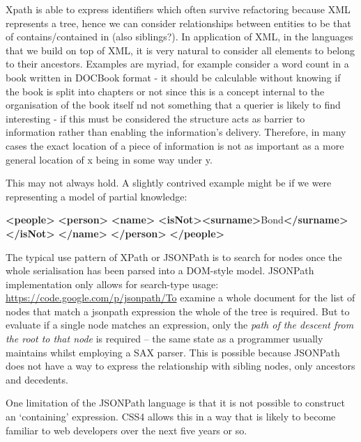 \documentclass[]{article}
\newenvironment{Shaded}{}{}
\newcommand{\KeywordTok}[1]{\textcolor[rgb]{0.00,0.44,0.13}{\textbf{{#1}}}}
\newcommand{\NormalTok}[1]{{#1}}
\begin{document}
Xpath is able to express identifiers which often survive refactoring
because XML represents a tree, hence we can consider relationships
between entities to be that of contains/contained in (also siblings?).
In application of XML, in the languages that we build on top of XML, it
is very natural to consider all elements to belong to their ancestors.
Examples are myriad, for example consider a word count in a book written
in DOCBook format - it should be calculable without knowing if the book
is split into chapters or not since this is a concept internal to the
organisation of the book itself nd not something that a querier is
likely to find interesting - if this must be considered the structure
acts as barrier to information rather than enabling the information's
delivery. Therefore, in many cases the exact location of a piece of
information is not as important as a more general location of x being in
some way under y.

This may not always hold. A slightly contrived example might be if we
were representing a model of partial knowledge:

\begin{Shaded}
\begin{Highlighting}[]
\KeywordTok{<people>}
   \KeywordTok{<person>}
      \KeywordTok{<name>}
         \KeywordTok{<isNot><surname>}\NormalTok{Bond}\KeywordTok{</surname></isNot>}
      \KeywordTok{</name>}
   \KeywordTok{</person>}
\KeywordTok{</people>}
\end{Highlighting}
\end{Shaded}

The typical use pattern of XPath or JSONPath is to search for nodes once
the whole serialisation has been parsed into a DOM-style model. JSONPath
implementation only allows for search-type usage:
\url{https://code.google.com/p/jsonpath/To} examine a whole document for
the list of nodes that match a jsonpath expression the whole of the tree
is required. But to evaluate if a single node matches an expression,
only the \emph{path of the descent from the root to that node} is
required -- the same state as a programmer usually maintains whilst
employing a SAX parser. This is possible because JSONPath does not have
a way to express the relationship with sibling nodes, only ancestors and
decedents.

One limitation of the JSONPath language is that it is not possible to
construct an `containing' expression. CSS4 allows this in a way that is
likely to become familiar to web developers over the next five years or
so.
\end{document}
